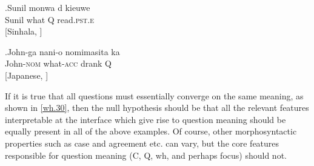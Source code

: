 \documentclass[charis]{glossa}
\begin{document}
\exg.\label{wh.90}Sunil mon{\textschwa}wa {d\textschwa} kieuwe \\
  Sunil what Q read.\textsc{pst.e} \\
  \hspace{\fill}[Sinhala, \cite{slade:2011}]

\exg.\label{wh.100}John-ga nani-o nomimasita ka \\
  John-\textsc{nom} what-\textsc{acc} drank Q \\
  \hspace{\fill}[Japanese, \cite{hagstrom:1998}]

If it is true that all questions must essentially converge on the same meaning, as shown in \ref{wh.30}, then the null hypothesis should be that all the relevant features interpretable at the interface which give rise to question meaning should be equally present in all of the above examples. Of course, other morphosyntactic properties such as case and agreement etc. can vary, but the core features responsible for question meaning (C, Q, wh, and perhaps focus) should not.
\end{document}
